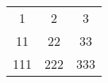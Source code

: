 \documentclass{article}
\begin{document}
\begin{tabular}{c|c|c}
\hline
1 & 2 & 3 \\
11 & 22 & 33 \\
111 & 222 & 333 \\
\hline
\end{tabular}
\end{document}
